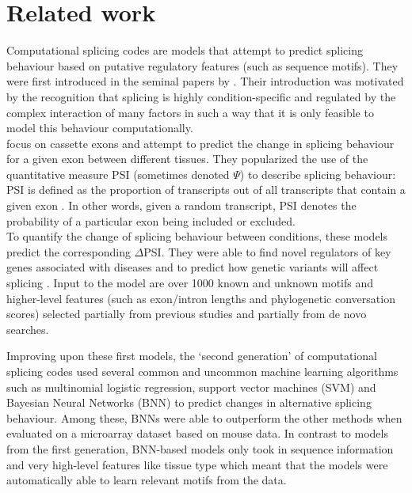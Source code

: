 \chapter{\label{ch:3-relatedwork}Related work} %

Computational splicing codes are models that attempt to predict splicing behaviour based on putative regulatory features (such as sequence motifs).
They were first introduced in the seminal papers by \cite{barash2010a}\cite{barash2010b}. Their introduction was motivated by the recognition that splicing is highly condition-specific and regulated by the complex interaction of many factors in such a way that it is only feasible to model this behaviour computationally.\\
\cite{barash2010a} focus on cassette exons and attempt to predict the change in splicing behaviour for a given exon between different tissues. They popularized the use of the quantitative measure PSI (sometimes denoted $\Psi$) to describe splicing behaviour:
PSI is defined as the proportion of transcripts out of all transcripts that contain a given exon \cite{psi}. In other words, given a random transcript, PSI denotes the probability of a particular exon being included or excluded.\\
To quantify the change of splicing behaviour between conditions, these models predict the corresponding $\Delta$PSI. They were able to find novel regulators of key genes associated with diseases and to predict how genetic variants will affect splicing \cite{splicingcodegood1} \cite{splicingcodegood2}. Input to the model are over 1000 known and unknown motifs and higher-level features (such as exon/intron lengths and phylogenetic conversation scores) selected partially from previous studies and partially from de novo searches.


Improving upon these first models, the `second generation' of computational splicing codes used several common and uncommon machine learning algorithms such as multinomial logistic regression, support vector machines (SVM) and Bayesian Neural Networks (BNN) to predict changes in alternative splicing behaviour. \cite{bnnsplicing} Among these, BNNs were able to outperform the other methods when evaluated on a microarray dataset based on mouse data. In contrast to models from the first generation, BNN-based models only took in sequence information and very high-level features like tissue type which meant that the models were automatically able to learn relevant motifs from the data.


